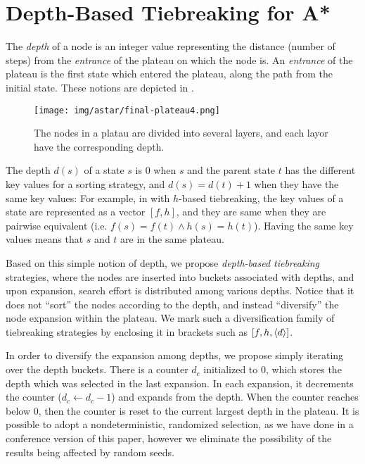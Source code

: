 \section{Depth-Based Tiebreaking for A*}

\label{sec:depth}

The \emph{depth} of a node is an integer value representing the distance
(number of steps) from the \emph{entrance} of the plateau on which the node is.
An \emph{entrance} of the plateau is the first state which entered the
plateau, along the path from the initial state. These notions are depicted
in .

\begin{figure}[htbp]
 \centering
 \texttt{[image: img/astar/final-plateau4.png]}
 \caption{The nodes in a platau are divided into several layers,
 and each layor have the corresponding depth.}
 \label{fig:plateau-depiction}
\end{figure}

The depth $d(s)$ of a
state $s$ is 0 when $s$ and the parent state $t$ has the different key
values for a sorting strategy, and $d(s)=d(t)+1$ when they have the same
key values: For example, in \astar with $h$-based tiebreaking, the key
values of a state are represented as a vector $[f,h]$, and they are same
when they are pairwise equivalent (i.e. $f(s) = f(t) \land h(s) =
h(t)$).  Having the same key values means that $s$ and $t$ are in the
same plateau. 

Based on this simple notion of depth, we propose \emph{depth-based
tiebreaking} strategies, where the nodes are inserted into buckets
associated with depths, and upon expansion, search effort is distributed
among various depths. Notice that it does not ``sort'' the nodes
according to the depth, and instead ``diversify'' the node expansion
within the plateau. We mark such a diversification family of
tiebreaking strategies by enclosing it in brackets such as $[f,h,{\left<d\right>}]$.

In order to diversify the expansion among depths, we propose simply
iterating over the depth buckets. There is a counter $d_c$ initialized
to 0, which stores the depth which was selected in the last expansion.
In each expansion, it decrements the counter ($d_c\leftarrow d_c-1$) and
expands from the depth. When the counter reaches below 0, then the
counter is reset to the current largest depth in the plateau.
It is possible to adopt a
nondeterministic, randomized selection, as we have done in a conference
version of this paper, however we eliminate the possibility of the
results being affected by random seeds.

